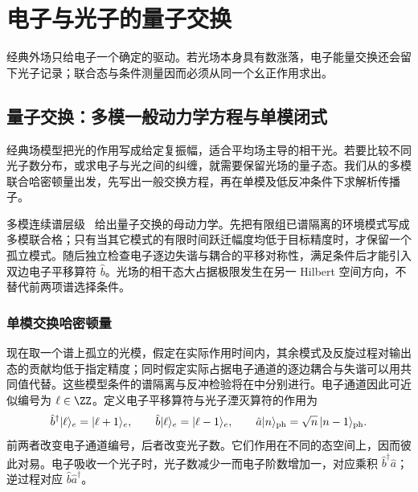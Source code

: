 \chapter{电子与光子的量子交换}\label{chap:quantum-electron-photon-exchange}

经典外场只给电子一个确定的驱动。若光场本身具有数涨落，电子能量交换还会留下光子记录；联合态与条件测量因而必须从同一个幺正作用求出。

\section{量子交换：多模一般动力学方程与单模闭式}

经典场模型把光的作用写成给定复振幅，适合平均场主导的相干光。若要比较不同光子数分布，或求电子与光之间的纠缠，就需要保留光场的量子态。我们从的多模联合哈密顿量出发，先写出一般交换方程，再在单模及低反冲条件下求解析传播子。

多模连续谱层级~ 给出量子交换的母动力学。先把有限组已谱隔离的环境模式写成多模联合格；只有当其它模式的有限时间跃迁幅度均低于目标精度时，才保留一个孤立模式。随后独立检查电子逐边失谐与耦合的平移对称性，满足条件后才能引入双边电子平移算符 $\hat b$。光场的相干态大占据极限发生在另一 Hilbert 空间方向，不替代前两项谱选择条件。



\subsection{单模交换哈密顿量}

现在取一个谱上孤立的光模，假定在实际作用时间内，其余模式及反旋过程对输出态的贡献均低于指定精度；同时假定实际占据电子通道的逐边耦合与失谐可以用共同值代替。这些模型条件的谱隔离与反冲检验将在中分别进行。电子通道因此可近似编号为 $\ell\in\ZZ$。定义电子平移算符与光子湮灭算符的作用为
\[
\hat b^\dagger|\ell\rangle_e=|\ell+1\rangle_e,\qquad
\hat b|\ell\rangle_e=|\ell-1\rangle_e,\qquad
\hat a|n\rangle_{\rm ph}=\sqrt n\,|n-1\rangle_{\rm ph}.
\]
前两者改变电子通道编号，后者改变光子数。它们作用在不同的态空间上，因而彼此对易。电子吸收一个光子时，光子数减少一而电子阶数增加一，对应乘积 $\hat b^\dagger\hat a$；逆过程对应 $\hat b\hat a^\dagger$。

